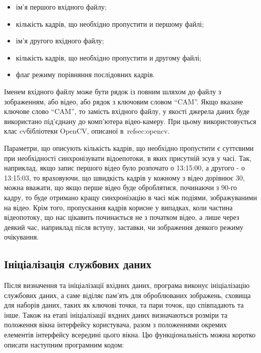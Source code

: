 \begin{itemize}
  \item ім'я першого вхідного файлу;
  \item кількість кадрів, що необхідно пропустити и першому файлі;
  \item ім'я другого вхідного файлу;
  \item кількість кадрів, що необхідно пропустити и другому файлі;
  \item флаг режиму порівняння послідовних кадрів.
\end{itemize}

Іменем вхідного файлу може бути рядок із повним шляхом до файлу з зображенням, або відео, або рядок з ключовим словом ``CAM''. Якщо вказане ключове слово ``CAM'', то замість вхідного файлу, у якості джерела даних буде використано під'єднану до комп'ютера відео-камеру. При цьому використовується клас cv\dotsVideoCapture бібліотеки OpenCV, описаної в~ref{sec:opencv}.

Параметри, що описують кількість кадрів, що необхідно пропустити є суттєвими при необхідності синхронізувати відоепотоки, в яких присутній зсув у часі. Так, наприклад, якщо запис першого відео було розпочато о 13:15:00, а другого - о 13:15:03, то враховуючи, що швидкість кадрів у кожному з відео дорівнює 30, можна вважати, що якщо перше відео буде оброблятися, починаючи з 90-го кадру, то буде отримано кращу синхронізацію в часі між подіями, зображуваними на відео. Крім того, пропускання кадрів корисне у випадках, коли частина відеопотоку, що нас цікавить починається не з початком відео, а лише через деякий час, наприклад після вступу, заставки, чи зображення деякого режиму очікування. 

\subsection{Ініціалізація службових даних}

Після визначення та ініціалізації вхідних даних, програма виконує ініціалізацію службових даних, а саме віділяє пам'ять для оброблюваних зображень, сховища для наборів даних, таких як ключові точки, та пари точок, що співпадають та інше. Також на етапі ініціалізації вхдних даних визначаються розміри та положення вікна інтерфейсу користувача, разом з положеннями окремих елементів інтерфейсу всередині цього вікна. Цю функціональність можна коротко описати наступним програмним кодом:

